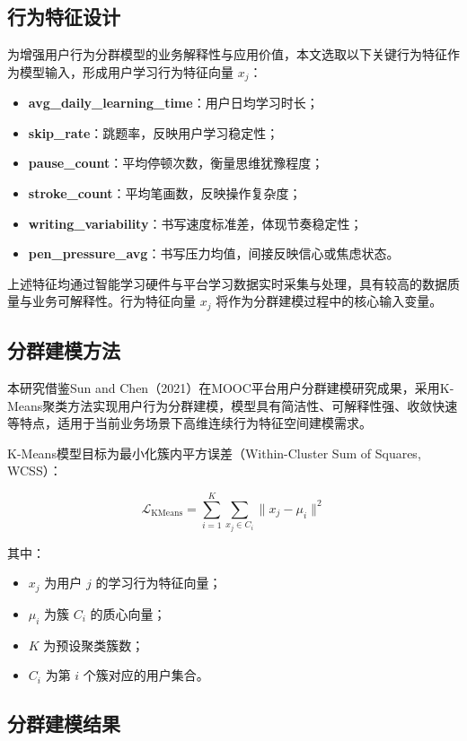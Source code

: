 \subsection{行为特征设计}

为增强用户行为分群模型的业务解释性与应用价值，本文选取以下关键行为特征作为模型输入，形成用户学习行为特征向量 $x_j$：
\begin{itemize}
\item \textbf{avg\_daily\_learning\_time}：用户日均学习时长；
\item \textbf{skip\_rate}：跳题率，反映用户学习稳定性；
\item \textbf{pause\_count}：平均停顿次数，衡量思维犹豫程度；
\item \textbf{stroke\_count}：平均笔画数，反映操作复杂度；
\item \textbf{writing\_variability}：书写速度标准差，体现节奏稳定性；
\item \textbf{pen\_pressure\_avg}：书写压力均值，间接反映信心或焦虑状态。
\end{itemize}
上述特征均通过智能学习硬件与平台学习数据实时采集与处理，具有较高的数据质量与业务可解释性。行为特征向量 $x_j$ 将作为分群建模过程中的核心输入变量。

\subsection{分群建模方法}

本研究借鉴Sun and Chen（2021）在MOOC平台用户分群建模研究成果，采用K-Means聚类方法实现用户行为分群建模，模型具有简洁性、可解释性强、收敛快速等特点，适用于当前业务场景下高维连续行为特征空间建模需求。

K-Means模型目标为最小化簇内平方误差（Within-Cluster Sum of Squares, WCSS）：

\begin{equation}
\mathcal{L}_{\text{KMeans}} = \sum_{i=1}^{K} \sum_{x_j \in C_i} \| x_j - \mu_i \|^2
\end{equation}

其中：

\begin{itemize}
\item $x_j$ 为用户 $j$ 的学习行为特征向量；
\item $\mu_i$ 为簇 $C_i$ 的质心向量；
\item $K$ 为预设聚类簇数；
\item $C_i$ 为第 $i$ 个簇对应的用户集合。
\end{itemize}

\subsection{分群建模结果}

